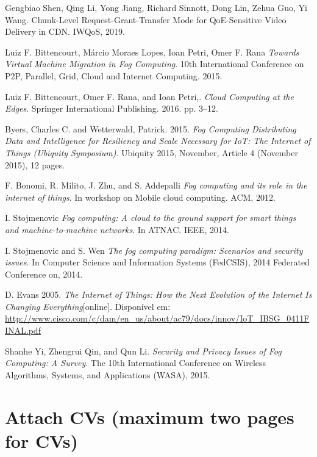 \documentclass[a4paper, 11pt]{article}
\begin{document}
\begin{thebibliography}{9}

 Gengbiao Shen, Qing Li, Yong Jiang, Richard Sinnott, Dong Lin, Zehua Guo, Yi Wang. Chunk-Level Request-Grant-Transfer Mode for QoE-Sensitive Video Delivery in CDN. IWQoS, 2019.

 Luiz F. Bittencourt, Márcio Moraes Lopes, Ioan Petri, Omer F. Rana \emph{Towards Virtual Machine Migration in Fog Computing}. 10th International Conference on P2P, Parallel, Grid, Cloud and Internet Computing. 2015.

 Luiz F. Bittencourt, Omer F. Rana, and Ioan Petri,. \emph{Cloud Computing at the Edges}. Springer International Publishing. 2016. pp. 3–12.

  Byers, Charles C. and Wetterwald, Patrick. 2015. \emph{Fog Computing Distributing Data and Intelligence for Resiliency and Scale Necessary for IoT: The Internet of Things (Ubiquity Symposium)}. Ubiquity 2015, November, Article 4 (November 2015), 12 pages.

 F. Bonomi, R. Milito, J. Zhu, and S. Addepalli \emph{Fog computing and its role in the internet of things}. In workshop on Mobile cloud computing. ACM, 2012.

 I. Stojmenovic \emph{Fog computing: A cloud to the ground support for smart things and machine-to-machine networks}. In ATNAC. IEEE, 2014.

 I. Stojmenovic and S. Wen \emph{The fog computing paradigm: Scenarios and security issues}. In Computer Science and Information Systems (FedCSIS), 2014 Federated Conference on, 2014.

  D. Evans 2005. \emph{The Internet of Things: How the Next Evolution of the Internet Is Changing Everything}[online]. Disponível em: \url{http://www.cisco.com/c/dam/en_us/about/ac79/docs/innov/IoT_IBSG_0411FINAL.pdf}

  Shanhe Yi, Zhengrui Qin, and Qun Li. \emph{Security and Privacy Issues of Fog Computing: A Survey}. The 10th International Conference on Wireless Algorithms, Systems, and Applications (WASA), 2015.





\end{thebibliography}
	
	\section{Attach CVs (maximum two pages for CVs)}
	
\end{document}
